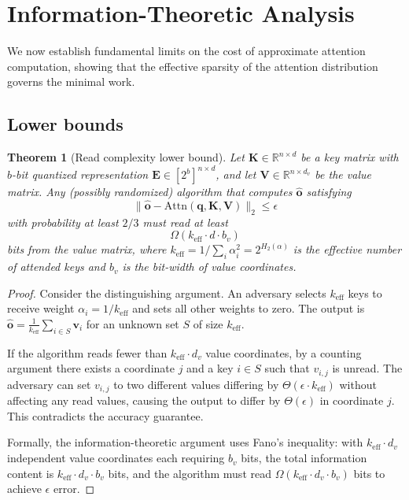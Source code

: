 \documentclass[10pt,twocolumn]{article}
\newtheorem{theorem}{Theorem}[section]
\theoremstyle{definition}
\newcommand{\R}{\mathbb{R}}
\newcommand{\bq}{\mathbf{q}}
\newcommand{\bv}{\mathbf{v}}
\newcommand{\bK}{\mathbf{K}}
\newcommand{\bV}{\mathbf{V}}
\begin{document}
\section{Information-Theoretic Analysis}
\label{sec:theory}

We now establish fundamental limits on the cost of approximate attention
computation, showing that the effective sparsity of the attention distribution
governs the minimal work.

\subsection{Lower bounds}

\begin{theorem}[Read complexity lower bound]
  \label{thm:lower_bound}
  Let $\bK \in \R^{n \times d}$ be a key matrix with $b$-bit quantized
  representation $\mathbf{E} \in [2^b]^{n \times d}$, and let $\bV \in
  \R^{n \times d_v}$ be the value matrix.  Any (possibly randomized) algorithm
  that computes $\hat{\mathbf{o}}$ satisfying
  \[
    \|\hat{\mathbf{o}} - \mathrm{Attn}(\bq, \bK, \bV)\|_2 \leq \epsilon
  \]
  with probability at least $2/3$ must read at least
  \begin{equation}
    \Omega\!\left(k_{\text{eff}} \cdot d \cdot b_v\right)
  \end{equation}
  bits from the value matrix, where $k_{\text{eff}} = 1/\sum_i \alpha_i^2 =
  2^{H_2(\alpha)}$ is the effective number of attended keys and $b_v$ is the
  bit-width of value coordinates.
\end{theorem}

\begin{proof}
  Consider the distinguishing argument.  An adversary selects $k_{\text{eff}}$
  keys to receive weight $\alpha_i = 1/k_{\text{eff}}$ and sets all other
  weights to zero.  The output is $\hat{\mathbf{o}} = \frac{1}{k_{\text{eff}}}
  \sum_{i \in S} \bv_i$ for an unknown set $S$ of size $k_{\text{eff}}$.

  If the algorithm reads fewer than $k_{\text{eff}} \cdot d_v$ value coordinates,
  by a counting argument there exists a coordinate $j$ and a key $i \in S$ such
  that $v_{i,j}$ is unread.  The adversary can set $v_{i,j}$ to two different
  values differing by $\Theta(\epsilon \cdot k_{\text{eff}})$ without affecting
  any read values, causing the output to differ by $\Theta(\epsilon)$ in
  coordinate $j$.  This contradicts the accuracy guarantee.

  Formally, the information-theoretic argument uses Fano's inequality: with
  $k_{\text{eff}} \cdot d_v$ independent value coordinates each requiring $b_v$
  bits, the total information content is $k_{\text{eff}} \cdot d_v \cdot b_v$
  bits, and the algorithm must read $\Omega(k_{\text{eff}} \cdot d_v \cdot b_v)$
  bits to achieve $\epsilon$ error.
\end{proof}
\end{document}
